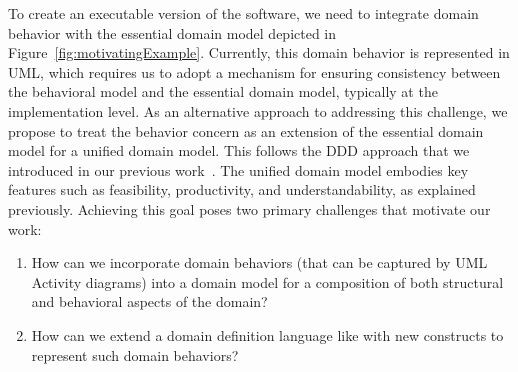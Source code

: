 %
To create an executable version of the software, we need to integrate domain behavior with the essential domain model depicted in Figure~\ref{fig:motivatingExample}. Currently, this domain behavior is represented in UML, which requires us to adopt a mechanism for ensuring consistency between the behavioral model and the essential domain model, typically at the implementation level. %
%
As an alternative approach to addressing this challenge, we propose to treat the behavior concern as an extension of the essential domain model for a unified domain model. This follows the DDD approach that we introduced in our previous work~\cite{le_domain_2018}. The unified domain model embodies key features such as feasibility, productivity, and understandability, as explained previously. Achieving this goal poses two primary challenges that motivate our work:

\begin{enumerate}
    \item How can we incorporate domain behaviors (that can be captured by UML Activity diagrams) into a domain model for a composition of both structural and behavioral aspects of the domain?
    \item How can we extend a domain definition language like \dcsl with new constructs to represent such domain behaviors?    
\end{enumerate}
